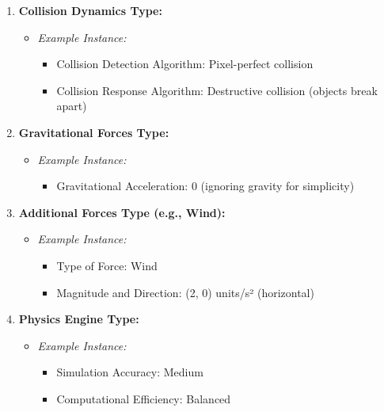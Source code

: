 \documentclass[
]{article}
\begin{document}
\begin{enumerate}
\def\labelenumi{\arabic{enumi}.}
\setcounter{enumi}{2}
\item
  \textbf{Collision Dynamics Type:}

  \begin{itemize}
  \item
    \emph{Example Instance:}

    \begin{itemize}
    \item
      Collision Detection Algorithm: Pixel-perfect collision
    \item
      Collision Response Algorithm: Destructive collision (objects break
      apart)
    \end{itemize}
  \end{itemize}
\item
  \textbf{Gravitational Forces Type:}

  \begin{itemize}
  \item
    \emph{Example Instance:}

    \begin{itemize}
    \item
      Gravitational Acceleration: 0 (ignoring gravity for simplicity)
    \end{itemize}
  \end{itemize}
\item
  \textbf{Additional Forces Type (e.g., Wind):}

  \begin{itemize}
  \item
    \emph{Example Instance:}

    \begin{itemize}
    \item
      Type of Force: Wind
    \item
      Magnitude and Direction: (2, 0) units/s² (horizontal)
    \end{itemize}
  \end{itemize}
\item
  \textbf{Physics Engine Type:}

  \begin{itemize}
  \item
    \emph{Example Instance:}

    \begin{itemize}
    \item
      Simulation Accuracy: Medium
    \item
      Computational Efficiency: Balanced
    \end{itemize}
  \end{itemize}
\end{enumerate}
\end{document}
